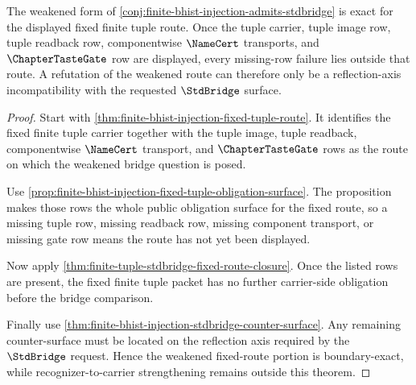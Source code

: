 \begin{theorem}
\label{thm:finite-bhist-injection-weakened-boundary-exactness}
The weakened form of \autoref{conj:finite-bhist-injection-admits-stdbridge} is exact for the displayed fixed finite tuple route. Once the tuple carrier, tuple image row, tuple readback row, componentwise $\NameCert$ transports, and $\ChapterTasteGate$ row are displayed, every missing-row failure lies outside that route. A refutation of the weakened route can therefore only be a reflection-axis incompatibility with the requested $\StdBridge$ surface.
\end{theorem}
\begin{proof}
Start with \autoref{thm:finite-bhist-injection-fixed-tuple-route}. It identifies the fixed finite tuple carrier together with the tuple image, tuple readback, componentwise $\NameCert$ transport, and $\ChapterTasteGate$ rows as the route on which the weakened bridge question is posed.

Use \autoref{prop:finite-bhist-injection-fixed-tuple-obligation-surface}. The proposition makes those rows the whole public obligation surface for the fixed route, so a missing tuple row, missing readback row, missing component transport, or missing gate row means the route has not yet been displayed.

Now apply \autoref{thm:finite-tuple-stdbridge-fixed-route-closure}. Once the listed rows are present, the fixed finite tuple packet has no further carrier-side obligation before the bridge comparison.

Finally use \autoref{thm:finite-bhist-injection-stdbridge-counter-surface}. Any remaining counter-surface must be located on the reflection axis required by the $\StdBridge$ request. Hence the weakened fixed-route portion is boundary-exact, while recognizer-to-carrier strengthening remains outside this theorem.
\end{proof}

